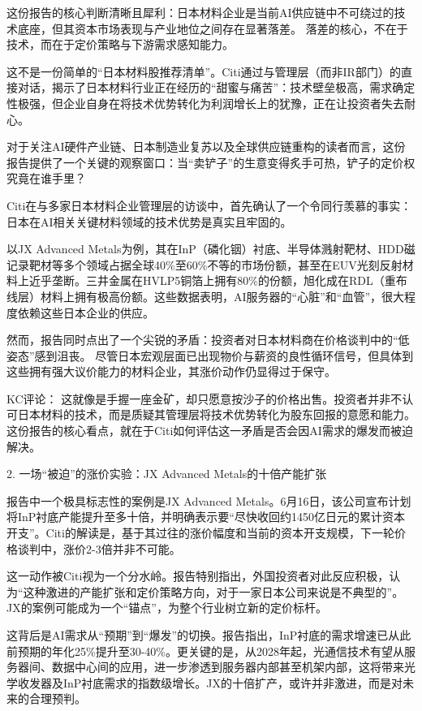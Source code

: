 \documentclass[11pt]{ctexart}
\begin{document}
这份报告的核心判断清晰且犀利：日本材料企业是当前AI供应链中不可绕过的技术底座，但其资本市场表现与产业地位之间存在显著落差。 落差的核心，不在于技术，而在于定价策略与下游需求感知能力。

这不是一份简单的“日本材料股推荐清单”。Citi通过与管理层（而非IR部门）的直接对话，揭示了日本材料行业正在经历的“甜蜜与痛苦”：技术壁垒极高，需求确定性极强，但企业自身在将技术优势转化为利润增长上的犹豫，正在让投资者失去耐心。

对于关注AI硬件产业链、日本制造业复苏以及全球供应链重构的读者而言，这份报告提供了一个关键的观察窗口：当“卖铲子”的生意变得炙手可热，铲子的定价权究竟在谁手里？

Citi在与多家日本材料企业管理层的访谈中，首先确认了一个令同行羡慕的事实：日本在AI相关关键材料领域的技术优势是真实且牢固的。

以JX Advanced Metals为例，其在InP（磷化铟）衬底、半导体溅射靶材、HDD磁记录靶材等多个领域占据全球40\%至60\%不等的市场份额，甚至在EUV光刻反射材料上近乎垄断。三井金属在HVLP5铜箔上拥有80\%的份额，旭化成在RDL（重布线层）材料上拥有极高份额。这些数据表明，AI服务器的“心脏”和“血管”，很大程度依赖这些日本企业的供应。

然而，报告同时点出了一个尖锐的矛盾：投资者对日本材料商在价格谈判中的“低姿态”感到沮丧。 尽管日本宏观层面已出现物价与薪资的良性循环信号，但具体到这些拥有强大议价能力的材料企业，其涨价动作仍显得过于保守。

KC评论： 这就像是手握一座金矿，却只愿意按沙子的价格出售。投资者并非不认可日本材料的技术，而是质疑其管理层将技术优势转化为股东回报的意愿和能力。这份报告的核心看点，就在于Citi如何评估这一矛盾是否会因AI需求的爆发而被迫解决。

2. 一场“被迫”的涨价实验：JX Advanced Metals的十倍产能扩张

报告中一个极具标志性的案例是JX Advanced Metals。6月16日，该公司宣布计划将InP衬底产能提升至多十倍，并明确表示要“尽快收回约1450亿日元的累计资本开支”。Citi的解读是，基于其过往的涨价幅度和当前的资本开支规模，下一轮价格谈判中，涨价2-3倍并非不可能。

这一动作被Citi视为一个分水岭。报告特别指出，外国投资者对此反应积极，认为“这种激进的产能扩张和定价策略方向，对于一家日本公司来说是不典型的”。JX的案例可能成为一个“锚点”，为整个行业树立新的定价标杆。

这背后是AI需求从“预期”到“爆发”的切换。报告指出，InP衬底的需求增速已从此前预期的年化25\%提升至30-40\%。更关键的是，从2028年起，光通信技术有望从服务器间、数据中心间的应用，进一步渗透到服务器内部甚至机架内部，这将带来光学收发器及InP衬底需求的指数级增长。JX的十倍扩产，或许并非激进，而是对未来的合理预判。
\end{document}
